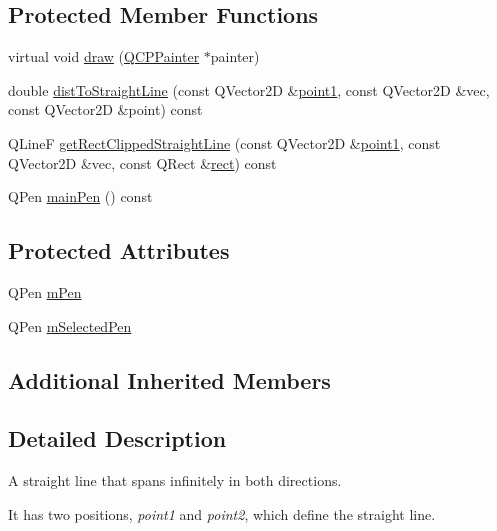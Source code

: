 \subsection*{Protected Member Functions}
\begin{DoxyCompactItemize}
\item 
virtual void \hyperlink{class_q_c_p_item_straight_line_a2daa1e1253216c26565d56a2d5530170}{draw} (\hyperlink{class_q_c_p_painter}{Q\+C\+P\+Painter} $\ast$painter)
\item 
double \hyperlink{class_q_c_p_item_straight_line_adc9b6c5bd33c7f806b748b79dfa25926}{dist\+To\+Straight\+Line} (const Q\+Vector2\+D \&\hyperlink{class_q_c_p_item_straight_line_ac131a6ffe456f2cc7364dce541fe0120}{point1}, const Q\+Vector2\+D \&vec, const Q\+Vector2\+D \&point) const 
\item 
Q\+Line\+F \hyperlink{class_q_c_p_item_straight_line_af18ac29577b5b96fece15b0ffea70177}{get\+Rect\+Clipped\+Straight\+Line} (const Q\+Vector2\+D \&\hyperlink{class_q_c_p_item_straight_line_ac131a6ffe456f2cc7364dce541fe0120}{point1}, const Q\+Vector2\+D \&vec, const Q\+Rect \&\hyperlink{_gen_blob_8m_aea8f6815d9a63491fc422c5572c6b3c3}{rect}) const 
\item 
Q\+Pen \hyperlink{class_q_c_p_item_straight_line_a63ef39814c5b560dbb7b13e3fec1d940}{main\+Pen} () const 
\end{DoxyCompactItemize}
\subsection*{Protected Attributes}
\begin{DoxyCompactItemize}
\item 
Q\+Pen \hyperlink{class_q_c_p_item_straight_line_a15106ddc2ebd73ed5c1bc57aa92bee8f}{m\+Pen}
\item 
Q\+Pen \hyperlink{class_q_c_p_item_straight_line_a0307a0d56a018656adbf798bc84c2a4b}{m\+Selected\+Pen}
\end{DoxyCompactItemize}
\subsection*{Additional Inherited Members}


\subsection{Detailed Description}
A straight line that spans infinitely in both directions. 

 It has two positions, {\itshape point1} and {\itshape point2}, which define the straight line. 

